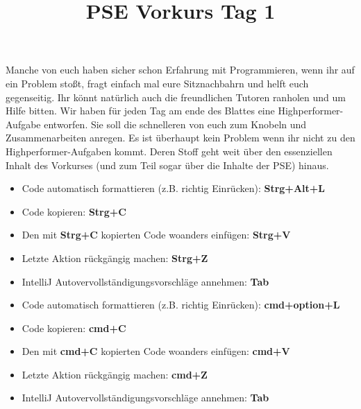 \documentclass{../../sheet}
\title{PSE Vorkurs Tag 1}
\begin{document}
\maketitle

Manche von euch haben sicher schon Erfahrung mit Programmieren, wenn ihr auf ein Problem stoßt, fragt einfach mal eure Sitznachbahrn und helft euch gegenseitig. Ihr könnt natürlich auch die freundlichen Tutoren ranholen und um Hilfe bitten.
Wir haben für jeden Tag am ende des Blattes eine Highperformer-Aufgabe entworfen. Sie soll die schnelleren von euch zum Knobeln und Zusammenarbeiten anregen. Es ist überhaupt kein Problem wenn ihr nicht zu den Highperformer-Aufgaben kommt. Deren Stoff geht weit über den essenziellen Inhalt des Vorkurses (und zum Teil sogar über die Inhalte der PSE) hinaus.


\begin{itemize}
    \item Code automatisch formattieren (z.B. richtig Einrücken): \textbf{Strg+Alt+L}
    \item Code kopieren: \textbf{Strg+C}
    \item Den mit \textbf{Strg+C} kopierten Code woanders einfügen: \textbf{Strg+V}
    \item Letzte Aktion rückgängig machen: \textbf{Strg+Z}
    \item IntelliJ Autovervollständigungsvorschläge annehmen: \textbf{Tab}
\end{itemize}

\begin{itemize}
    \item Code automatisch formattieren (z.B. richtig Einrücken): \textbf{cmd+option+L}
    \item Code kopieren: \textbf{cmd+C}
    \item Den mit \textbf{cmd+C} kopierten Code woanders einfügen: \textbf{cmd+V}
    \item Letzte Aktion rückgängig machen: \textbf{cmd+Z}
    \item IntelliJ Autovervollständigungsvorschläge annehmen: \textbf{Tab}
\end{itemize}


\newpage
\end{document}
